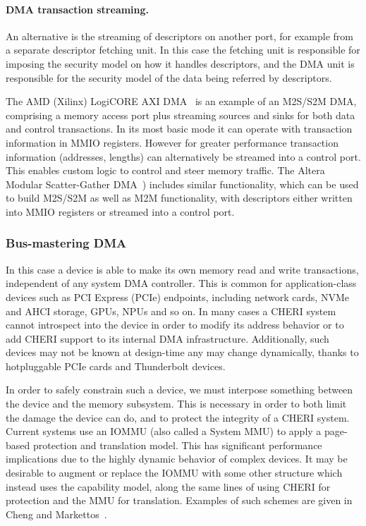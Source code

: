 \paragraph{DMA transaction streaming.}
An alternative is the streaming of descriptors on another port, for example from a separate descriptor fetching unit.
In this case the fetching unit is responsible for imposing the security model on how it handles descriptors, and the DMA unit is responsible for the security model of the data being referred by descriptors.

The AMD (Xilinx) LogiCORE AXI DMA~\cite{amd-logicoredma} is an example of an M2S/S2M DMA, comprising a memory access port plus streaming sources and sinks for both data and control transactions.
In its most basic mode it can operate with transaction information in MMIO registers.
However for greater performance transaction information (addresses, lengths) can alternatively be streamed into a control port.
This enables custom logic to control and steer memory traffic.
The Altera Modular Scatter-Gather DMA~\cite{altera-embeddedperipheralsug}) includes similar functionality, which can be used to build M2S/S2M as well as M2M functionality, with descriptors either written into MMIO registers or streamed into a control port.

\subsubsection{Bus-mastering DMA}

In this case a device is able to make its own memory read and write transactions, independent of any system DMA controller.
This is common for application-class devices such as PCI Express (PCIe) endpoints, including network cards, NVMe and AHCI storage, GPUs, NPUs and so on.
In many cases a CHERI system cannot introspect into the device in order to modify its address behavior or to add CHERI support to its internal DMA infrastructure.
Additionally, such devices may not be known at design-time any may change dynamically, thanks to hotpluggable PCIe cards and Thunderbolt devices.

In order to safely constrain such a device, we must interpose something between the device and the memory subsystem.
This is necessary in order to both limit the damage the device can do, and to protect the integrity of a CHERI system.
Current systems use an IOMMU (also called a System MMU) to apply a page-based protection and translation model.
This has significant performance implications due to the highly dynamic behavior of complex devices.
It may be desirable to augment or replace the IOMMU with some other structure which instead uses the capability model, along the same lines of using CHERI for protection and the MMU for translation.
Examples of such schemes are given in Cheng and Markettos~\cite{DBLP:conf/micro/MarkettosBBNMW20, cheng2025-capchecker}.

